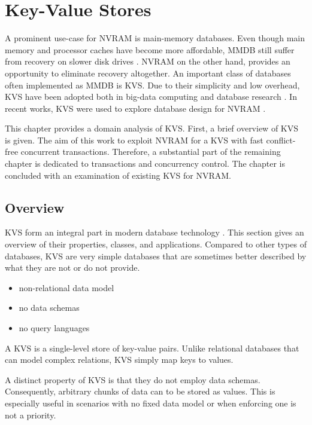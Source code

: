 \chapter{Key-Value Stores}
\label{ch:kvs}

A prominent use-case for NVRAM is main-memory databases. Even though main memory
and processor caches have become more affordable, MMDB still suffer from
recovery on slower disk drives \cite{oukid2015instant, schwalb2016hyrise}. NVRAM
on the other hand, provides an opportunity to eliminate recovery altogether. An
important class of databases often implemented as MMDB is KVS. Due to their
simplicity and low overhead, KVS have been adopted both in big-data computing
and database research \cite{decandia2007dynamo, lakshman2010cassandra,
wang2015hydradb}. In recent works, KVS were used to explore database design for
NVRAM \cite{bailey2013exploring, zhou2016nvht, wu2016nvmcached}.

This chapter provides a domain analysis of KVS. First, a brief overview of KVS
is given. The aim of this work to exploit NVRAM for a KVS with fast
conflict-free concurrent transactions. Therefore, a substantial part of the
remaining chapter is dedicated to transactions and concurrency control. The
chapter is concluded with an examination of existing KVS for NVRAM.

\section{Overview}

KVS form an integral part in modern database technology \cite{fiebig2016one}.
This section gives an overview of their properties, classes, and applications.
Compared to other types of databases, KVS are very simple databases that are
sometimes better described by what they are not or do not provide.

\begin{itemize}
    \item non-relational data model
    \item no data schemas
    \item no query languages
\end{itemize}

A KVS is a single-level store of key-value pairs. Unlike relational databases
that can model complex relations, KVS simply map keys to values.


A distinct property of KVS is that they do not employ data schemas.
Consequently, arbitrary chunks of data can to be stored as values. This is
especially useful in scenarios with no fixed data model or when enforcing one is
not a priority.

